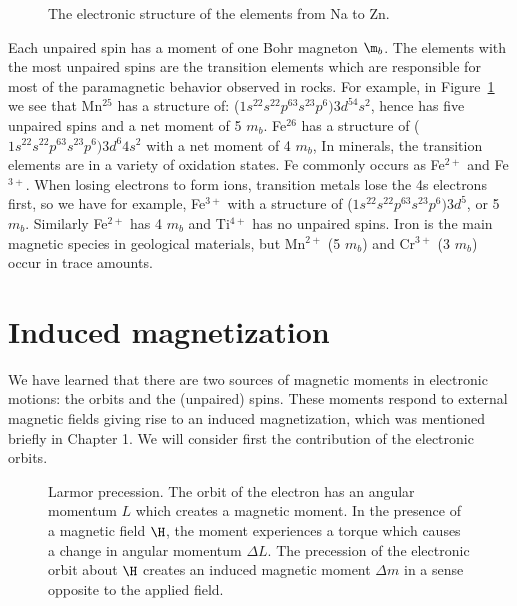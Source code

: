 \begin{figure}[h!tb]
\epsfxsize 16cm
\centering {}
\caption{The electronic structure of the elements from Na to Zn. }
\label{fig:structure}
\end{figure}

\eject


Each unpaired spin has a moment of one 
Bohr magneton $\m_b$. 
  The elements with the most unpaired spins are the transition elements which  are responsible for 
most of the paramagnetic behavior observed in rocks.     For example, in  Figure~\ref{fig:structure} we see that Mn$^{25}$ has a structure of: ($1s^22s^22p^63s^23p^6) 3d^54s^2$, hence has five unpaired spins and a net moment of 5 $m_b$.   Fe$^{26}$ has a structure of ($1s^22s^22p^63s^23p^6) 3d^6 4s^2$ with a net moment of 4 $m_b$,  In minerals, the transition elements are in a variety of oxidation states.  Fe commonly occurs as Fe$^{2+}$ and Fe$^{3+}$.  When losing electrons to form ions, transition metals lose the 4s electrons first, so we have for example, Fe$^{3+}$ with a structure of ($1s^22s^22p^63s^23p^6) 3d^5$, or 5 $m_b$.  Similarly Fe$^{2+}$ has 4 $m_b$ and Ti$^{4+}$ has no unpaired spins.  Iron is the main magnetic species in geological materials, but Mn$^{2+}$ (5 $m_b$) and Cr$^{3+}$ (3 $m_b$) occur in trace amounts.  




\section{Induced magnetization}  


We have learned that there are two sources of magnetic moments in electronic motions:  the orbits and the (unpaired)  spins.      These moments respond to external magnetic fields giving rise to an induced magnetization, which was mentioned briefly in Chapter 1.  We will consider first the contribution of the 
electronic orbits.  

\begin{figure}[htb]
\epsfxsize 2in
\centering {}
\caption{Larmor precession.  The orbit of the electron has an angular momentum $L$ which creates a magnetic moment.  In the presence of a magnetic field $\H$, the moment experiences a torque which causes a change in angular momentum $\Delta L$.  The precession of the electronic orbit about $\H$ creates an induced magnetic moment $\Delta m$ in a sense opposite to the applied field.}
\label{fig:larmor}
\end{figure}

